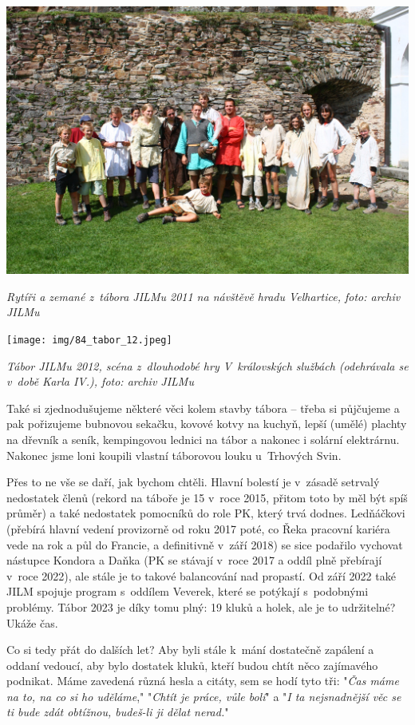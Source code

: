 \documentclass[a5paper, 11pt, twoside]{article}
\begin{document}
 \includegraphics[width=\textwidth]{img/83_tabor_11.jpg}

\textit{Rytíři a zemané z~tábora JILMu 2011 na návštěvě hradu Velhartice,
foto: archiv JILMu}

 \texttt{[image: img/84\_tabor\_12.jpeg]}

\textit{Tábor JILMu 2012, scéna z~dlouhodobé hry V~královských službách
(odehrávala se v~době Karla IV.), foto: archiv JILMu}

Také si zjednodušujeme některé věci kolem stavby tábora -- třeba si
půjčujeme a pak pořizujeme bubnovou sekačku, kovové kotvy na kuchyň,
lepší (umělé) plachty na dřevník a seník, kempingovou lednici na tábor a
nakonec i solární elektrárnu. Nakonec jsme loni koupili vlastní
táborovou louku u~Trhových Svin.

Přes to ne vše se daří, jak bychom chtěli. Hlavní bolestí je v~zásadě
setrvalý nedostatek členů (rekord na táboře je 15 v~roce 2015, přitom
toto by měl být spíš průměr) a také nedostatek pomocníků do role PK,
který trvá dodnes. Ledňáčkovi (přebírá hlavní vedení provizorně od roku
2017 poté, co Řeka pracovní kariéra vede na rok a půl do Francie, a
definitivně v~září 2018) se sice podařilo vychovat nástupce Kondora a
Daňka (PK se stávají v~roce 2017 a oddíl plně přebírají v~roce 2022),
ale stále je to takové balancování nad propastí. Od září 2022 také JILM
spojuje program s~oddílem Veverek, které se potýkají s~podobnými
problémy. Tábor 2023 je díky tomu plný: 19 kluků a holek, ale je to
udržitelné? Ukáže čas.

Co si tedy přát do dalších let? Aby byli stále k~mání dostatečně
zapálení a oddaní vedoucí, aby bylo dostatek kluků, kteří budou chtít
něco zajímavého podnikat. Máme zavedená různá hesla a citáty, sem se
hodí tyto tři: "\textit{Čas máme na to, na co si ho uděláme},"
"\textit{Chtít je práce, vůle bolí}" a "\textit{I ta nejsnadnější věc se
ti bude zdát obtížnou, budeš-li ji dělat nerad.}"
\end{document}
